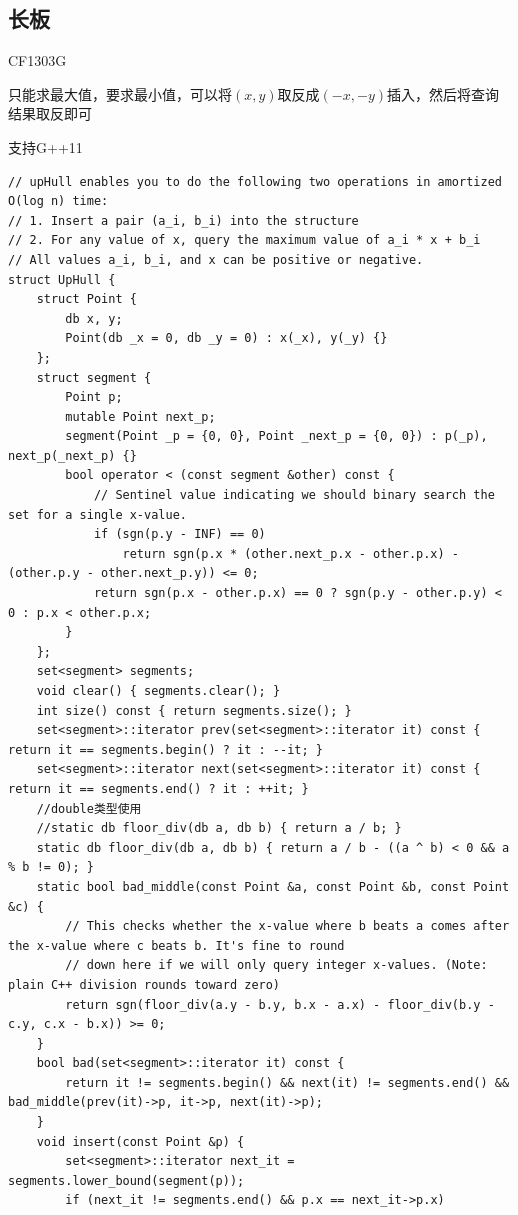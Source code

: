 \subsection{长板}
CF1303G\par
只能求最大值，要求最小值，可以将$(x, y)$取反成$(-x, -y)$插入，然后将查询结果取反即可\par
支持G++11\par
\begin{lstlisting}
// upHull enables you to do the following two operations in amortized O(log n) time:
// 1. Insert a pair (a_i, b_i) into the structure
// 2. For any value of x, query the maximum value of a_i * x + b_i
// All values a_i, b_i, and x can be positive or negative.
struct UpHull {
	struct Point {
	    db x, y; 
	    Point(db _x = 0, db _y = 0) : x(_x), y(_y) {}
	};
    struct segment {
        Point p;
        mutable Point next_p;
        segment(Point _p = {0, 0}, Point _next_p = {0, 0}) : p(_p), next_p(_next_p) {}
        bool operator < (const segment &other) const {
            // Sentinel value indicating we should binary search the set for a single x-value.
            if (sgn(p.y - INF) == 0)
            	return sgn(p.x * (other.next_p.x - other.p.x) - (other.p.y - other.next_p.y)) <= 0;
            return sgn(p.x - other.p.x) == 0 ? sgn(p.y - other.p.y) < 0 : p.x < other.p.x;
        }
    };
    set<segment> segments;
	void clear() { segments.clear(); }
    int size() const { return segments.size(); }
    set<segment>::iterator prev(set<segment>::iterator it) const { return it == segments.begin() ? it : --it; }
    set<segment>::iterator next(set<segment>::iterator it) const { return it == segments.end() ? it : ++it; }
    //double类型使用
	//static db floor_div(db a, db b) { return a / b; }
	static db floor_div(db a, db b) { return a / b - ((a ^ b) < 0 && a % b != 0); }
	static bool bad_middle(const Point &a, const Point &b, const Point &c) {
        // This checks whether the x-value where b beats a comes after the x-value where c beats b. It's fine to round
        // down here if we will only query integer x-values. (Note: plain C++ division rounds toward zero)
        return sgn(floor_div(a.y - b.y, b.x - a.x) - floor_div(b.y - c.y, c.x - b.x)) >= 0;
    }
    bool bad(set<segment>::iterator it) const {
        return it != segments.begin() && next(it) != segments.end() && bad_middle(prev(it)->p, it->p, next(it)->p);
    }
    void insert(const Point &p) {
        set<segment>::iterator next_it = segments.lower_bound(segment(p));
        if (next_it != segments.end() && p.x == next_it->p.x)

\end{lstlisting}
